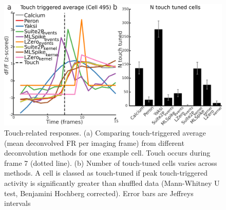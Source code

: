 \documentclass[a4paper,10pt,twocolumn]{article}
\begin{document}
\begin{figure}
\includegraphics[width=\textwidth]{full_figs_19v2/why_deconvolve_F6_19v2.png} 
\caption{\label{fig:touch_triggered} Touch-related responses. (a) Comparing touch-triggered average (mean deconvolved FR per imaging frame) from different deconvolution methods for one example cell. Touch occurs during frame 7 (dotted line). (b) Number of touch-tuned cells varies across methods. A cell is classed as touch-tuned if peak touch-triggered activity is significantly greater than shuffled data (Mann-Whitney U test, Benjamini Hochberg corrected). Error bars are Jeffreys intervals}
\end{figure}






%
\end{document}
